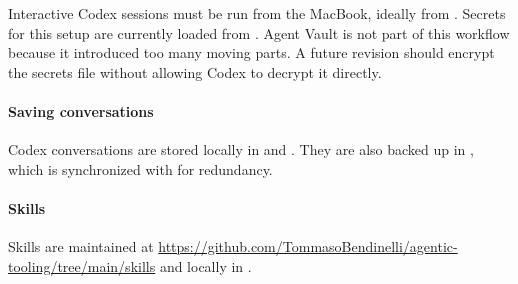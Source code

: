 

Interactive Codex sessions must be run from the MacBook, ideally from .
Secrets for this setup are currently loaded from .
Agent Vault is not part of this workflow because it introduced too many moving parts.
A future revision should encrypt the secrets file without allowing Codex to decrypt it directly.

\paragraph{Saving conversations}
Codex conversations are stored locally in  and .
They are also backed up in , which is synchronized with  for redundancy.

\paragraph{Skills}
Skills are maintained at \url{https://github.com/TommasoBendinelli/agentic-tooling/tree/main/skills} and locally in .

